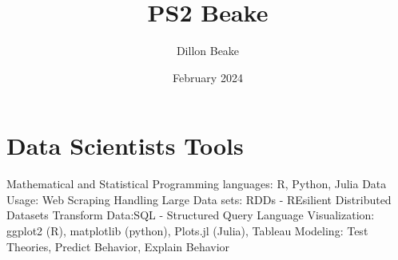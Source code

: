 \documentclass{article}
\title{PS2 Beake}
\author{Dillon Beake}
\date{February 2024}
\begin{document}
\maketitle

\section{Data Scientists Tools}

Mathematical and Statistical Programming languages: R, Python, Julia
Data Usage: Web Scraping
Handling Large Data sets: RDDs - REsilient Distributed Datasets
Transform Data:SQL - Structured Query Language
Visualization: ggplot2 (R), matplotlib (python), Plots.jl (Julia), Tableau
Modeling: Test Theories, Predict Behavior, Explain Behavior
\end{document}
